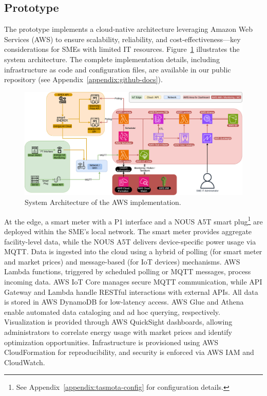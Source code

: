 \subsection{Prototype}
\label{methodology:prototype}
The prototype implements a cloud-native architecture leveraging Amazon Web Services (AWS) to ensure scalability, reliability, and cost-effectiveness—key considerations for SMEs with limited IT resources. Figure~\ref{fig:architecture} illustrates the system architecture. The complete implementation details, including infrastructure as code and configuration files, are available in our public repository (see Appendix~\ref{appendix:github-docs}).
\begin{figure}[htbp]
\centering
\includegraphics[width=1.1\textwidth]{fig/architektur_new_2.png}
\caption{System Architecture of the AWS implementation.}
\label{fig:architecture}
\end{figure}
At the edge, a smart meter with a P1 interface and a NOUS A5T smart plug\footnote{See Appendix~\ref{appendix:tasmota-config} for configuration details.} are deployed within the SME's local network. The smart meter provides aggregate facility-level data, while the NOUS A5T delivers device-specific power usage via MQTT. Data is ingested into the cloud using a hybrid of polling (for smart meter and market prices) and message-based (for IoT devices) mechanisms.
AWS Lambda functions, triggered by scheduled polling or MQTT messages, process incoming data. AWS IoT Core manages secure MQTT communication, while API Gateway and Lambda handle RESTful interactions with external APIs. All data is stored in AWS DynamoDB for low-latency access. AWS Glue and Athena enable automated data cataloging and ad hoc querying, respectively. Visualization is provided through AWS QuickSight dashboards, allowing administrators to correlate energy usage with market prices and identify optimization opportunities. Infrastructure is provisioned using AWS CloudFormation for reproducibility, and security is enforced via AWS IAM and CloudWatch.
